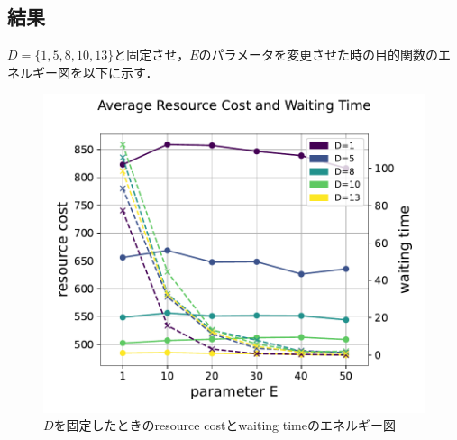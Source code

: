 \documentclass[conference]{IEEEtran}
\begin{document}
\subsection{結果}
$D=\{1,5,8,10,13\}$と固定させ，$E$のパラメータを変更させた時の目的関数のエネルギー図を以下に示す．
\begin{figure}[htbp]
\centerline{\includegraphics[scale=0.3]{./fig/D.pdf}}
\caption{$D$を固定したときのresource costとwaiting timeのエネルギー図}
\label{fig2}
\end{figure}
\end{document}
